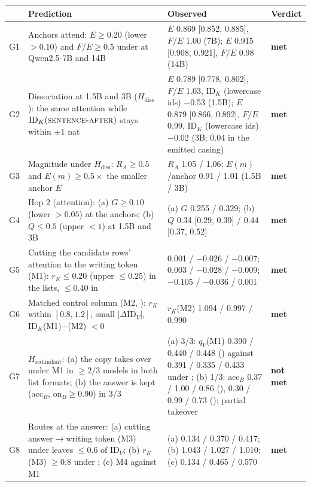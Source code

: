 \begin{tabular}{p{}p{}p{}p{}}
\toprule
 & Prediction & Observed & Verdict \\
\midrule
G1 & Anchors attend: $E \geq 0.20$ (lower $> 0.10$) and $F/E \geq 0.5$ under \fmtPost{} at Qwen2.5-7B and 14B & $E$ 0.869 [0.852, 0.885], $F/E$ 1.00 (7B); $E$ 0.915 [0.908, 0.921], $F/E$ 0.98 (14B) & \textbf{met} \\
G2 & Dissociation at 1.5B and 3B ($H_{\mathrm{diss}}$): the same attention while $\mathrm{ID}_K(\text{\textsc{sentence-after}{}})$ stays within $\pm 1$ nat & $E$ 0.789 [0.778, 0.802], $F/E$ 1.03, $\mathrm{ID}_K$ (lowercase ids) $-$0.53 (1.5B); $E$ 0.879 [0.866, 0.892], $F/E$ 0.99, $\mathrm{ID}_K$ (lowercase ids) $-$0.02 (3B; 0.04 in the emitted casing) & \textbf{met} \\
G3 & Magnitude under $H_{\mathrm{diss}}$: $R_A \geq 0.5$ and $E(m) \geq 0.5\times$ the smaller anchor $E$ & $R_A$ 1.05 / 1.06; $E(m)$/anchor 0.91 / 1.01 (1.5B / 3B) & \textbf{met} \\
G4 & Hop 2 (attention): (a) $G \geq 0.10$ (lower $> 0.05$) at the anchors; (b) $Q \leq 0.5$ (upper $< 1$) at 1.5B and 3B & (a) $G$ 0.255 / 0.329; (b) $Q$ 0.34 [0.29, 0.39] / 0.44 [0.37, 0.52] & \textbf{met} \\
\midrule
G5 & Cutting the candidate rows' attention to the writing token (M1): $r_K \leq 0.20$ (upper $\leq 0.25$) in the lists, $\leq 0.40$ in \fmtPost{} & \fmtListA{} 0.001 / $-$0.026 / $-$0.007; \fmtOpt{} 0.003 / $-$0.028 / $-$0.009; \fmtPost{} $-$0.105 / $-$0.036 / 0.001 & \textbf{met} \\
G6 & Matched control column (M2, \fmtListA{}): $r_K$ within $[0.8, 1.2]$, small $|\Delta\mathrm{ID}_V|$, $\mathrm{ID}_K$(M1)$-$(M2) $< 0$ & $r_K$(M2) 1.094 / 0.997 / 0.990 & \textbf{met} \\
G7 & $H_{\mathrm{redundant}}$: (a) the copy takes over under M1 in $\geq 2/3$ models in both list formats; (b) the answer is kept (acc$_B$, on$_B \geq 0.90$) in 3/3 & (a) 3/3: $q_V$(M1) 0.390 / 0.440 / 0.448 (\fmtListA{}) against 0.391 / 0.335 / 0.433 under \fmtNone{}; (b) 1/3: acc$_B$ 0.37 / 1.00 / 0.86 (\fmtListA{}), 0.30 / 0.99 / 0.73 (\fmtOpt{}); partial takeover & \textbf{not met} \\
G8 & Routes at the answer: (a) cutting answer$\to$writing token (M3) under \fmtNone{} leaves $\leq 0.6$ of $\mathrm{ID}_V$; (b) $r_K$(M3) $\geq 0.8$ under \fmtListA{}; (c) M4 against M1 & (a) 0.134 / 0.370 / 0.417; (b) 1.043 / 1.027 / 1.010; (c) 0.134 / 0.465 / 0.570 & \textbf{met} \\

\end{tabular}
